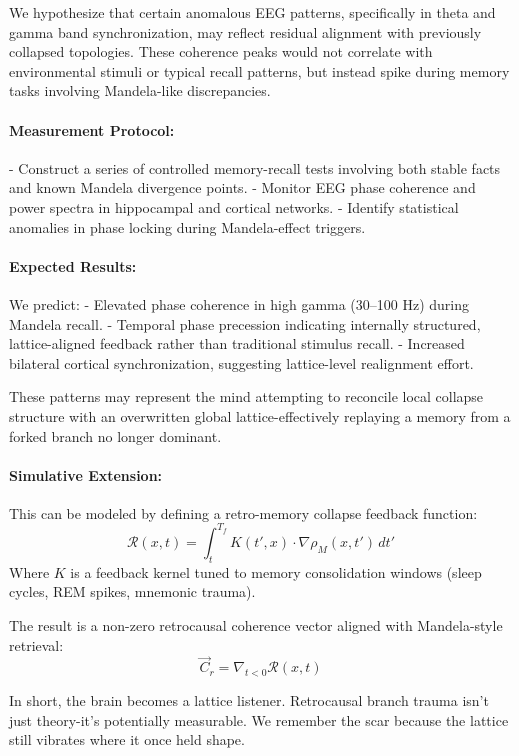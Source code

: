 We hypothesize that certain anomalous EEG patterns, specifically in theta and gamma band synchronization, may reflect residual alignment with previously collapsed topologies. These coherence peaks would not correlate with environmental stimuli or typical recall patterns, but instead spike during memory tasks involving Mandela-like discrepancies.

\paragraph{Measurement Protocol:}\cite{chapter8_meta}
- Construct a series of controlled memory-recall tests involving both stable facts and known Mandela divergence points.
- Monitor EEG phase coherence and power spectra in hippocampal and cortical networks.
- Identify statistical anomalies in phase locking during Mandela-effect triggers.

\paragraph{Expected Results:}
We predict:
- Elevated phase coherence in high gamma (30–100 Hz) during Mandela recall.
- Temporal phase precession indicating internally structured, lattice-aligned feedback rather than traditional stimulus recall.
- Increased bilateral cortical synchronization, suggesting lattice-level realignment effort.

These patterns may represent the mind attempting to reconcile local collapse structure with an overwritten global lattice-effectively replaying a memory from a forked branch no longer dominant.

\paragraph{Simulative Extension:}
This can be modeled by defining a retro-memory collapse feedback function:
\[
\mathcal{R}(x,t) = \int_{t}^{T_f} K(t', x) \cdot \nabla \rho_M(x, t') \, dt'
\]
Where \( K \) is a feedback kernel tuned to memory consolidation windows (sleep cycles, REM spikes, mnemonic trauma).

The result is a non-zero retrocausal coherence vector aligned with Mandela-style retrieval:
\[
\vec{C}_r = \nabla_{t<0} \mathcal{R}(x,t)
\]

In short, the brain becomes a lattice listener. Retrocausal branch trauma isn’t just theory-it’s potentially measurable. We remember the scar because the lattice still vibrates where it once held shape.

